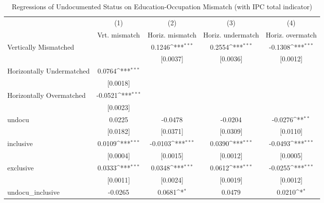 \begin{table}[htbp]\centering
\def\sym#1{\ifmmode^{#1}\else\(^{#1}\)\fi}
\caption{Regressions of Undocumented Status on Education-Occupation Mismatch (with IPC total indicator)}
\begin{tabular}{l*{4}{c}}
\toprule
                    &\multicolumn{1}{c}{(1)}         &\multicolumn{1}{c}{(2)}         &\multicolumn{1}{c}{(3)}         &\multicolumn{1}{c}{(4)}         \\
                    &Vrt. mismatch         &Horiz. mismatch         &Horiz. undermatch         &Horiz. overmatch         \\
\midrule
Vertically Mismatched&                     &      0.1246\sym{***}&      0.2554\sym{***}&     -0.1308\sym{***}\\
                    &                     &    [0.0037]         &    [0.0036]         &    [0.0012]         \\
\addlinespace
Horizontally Undermatched&      0.0764\sym{***}&                     &                     &                     \\
                    &    [0.0018]         &                     &                     &                     \\
\addlinespace
Horizontally Overmatched&     -0.0521\sym{***}&                     &                     &                     \\
                    &    [0.0023]         &                     &                     &                     \\
\addlinespace
undocu              &      0.0225         &     -0.0478         &     -0.0204         &     -0.0276\sym{**} \\
                    &    [0.0182]         &    [0.0371]         &    [0.0309]         &    [0.0110]         \\
\addlinespace
inclusive           &      0.0109\sym{***}&     -0.0103\sym{***}&      0.0390\sym{***}&     -0.0493\sym{***}\\
                    &    [0.0004]         &    [0.0015]         &    [0.0012]         &    [0.0005]         \\
\addlinespace
exclusive           &      0.0333\sym{***}&      0.0348\sym{***}&      0.0612\sym{***}&     -0.0255\sym{***}\\
                    &    [0.0011]         &    [0.0024]         &    [0.0019]         &    [0.0012]         \\
\addlinespace
undocu\_inclusive    &     -0.0265         &      0.0681\sym{*}  &      0.0479         &      0.0210\sym{*}  \\

\end{tabular}
\end{table}
